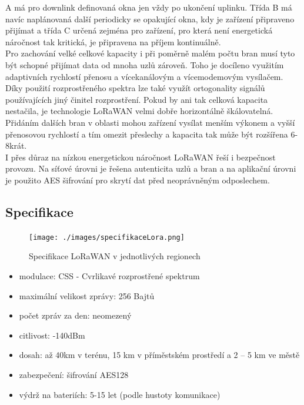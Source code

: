 \documentclass{ctuthesis}
\begin{document}
A má pro downlink definovaná okna jen vždy po ukončení uplinku. Třída B má navíc
naplánovaná další periodicky se opakující okna, kdy je zařízení připraveno přijímat a třída C
určená zejména pro zařízení, pro která není energetická náročnost tak kritická, je připravena na
příjem kontinuálně.\\
Pro zachování velké celkové kapacity i při poměrně malém počtu bran musí tyto být schopné
přijímat data od mnoha uzlů zároveň. Toho je docíleno využitím adaptivních rychlostí přenosu
a vícekanálovým a vícemodemovým vysílačem. Díky použití rozprostřeného spektra lze také
využít ortogonality signálů používajících jiný činitel rozprostření. Pokud by ani tak celková
kapacita nestačila, je technologie LoRaWAN velmi dobře horizontálně škálovatelná. Přidáním
dalších bran v oblasti mohou zařízení vysílat menším výkonem a vyšší přenosovou rychlostí a
tím omezit přeslechy a kapacita tak může být rozšířena 6-8krát.\\
I přes důraz na nízkou energetickou náročnost LoRaWAN řeší i bezpečnost provozu. Na síťové
úrovni je řešena autenticita uzlů a bran a na aplikační úrovni je použito AES šifrování pro skrytí
dat před neoprávněným odposlechem.
\subsection{Specifikace}
\begin{figure}
\caption{Specifikace LoRaWAN v jednotlivých regionech \cite{loraalliance2}}
\texttt{[image: ./images/specifikaceLora.png]}
\label{fig:loraSpec}
\end{figure}
\begin{itemize}
\item
modulace: CSS - Cvrlikavé rozprostřené spektrum
\item
maximální velikost zprávy: 256 Bajtů
\item
počet zpráv za den: neomezený
\item
citlivost: -140dBm
\item
dosah: až 40km v terénu, 15 km v příměstském prostředí a 2 – 5 km ve městě
\item
zabezpečení: šifrování AES128
\item
výdrž na bateriích: 5-15 let (podle hustoty komunikace) \cite{iotportalLora}
\end{itemize}
\end{document}

